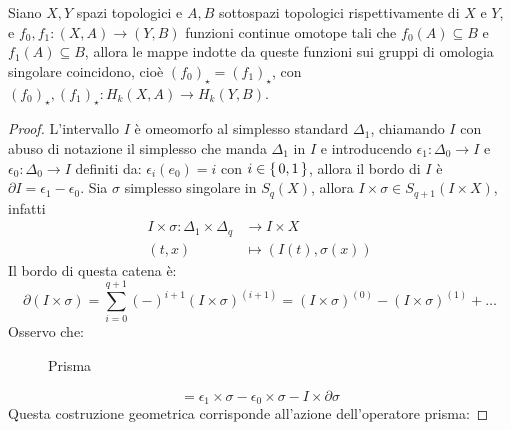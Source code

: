 \begin{theorem}
  Siano $ X, Y $ spazi topologici e $ A, B $ sottospazi topologici
  rispettivamente di $ X $ e $ Y $, e $ f_0, f_1 \colon (X, A) \to (Y, B) $ funzioni
  continue omotope tali che $ f_0(A) \subseteq B $ e $ f_1(A) \subseteq B $, allora le mappe
  indotte da queste funzioni sui gruppi di omologia singolare coincidono, cioè
  $ (f_0)_\star = (f_1)_\star $, con $ (f_0)_\star, (f_1)_\star \colon H_k(X,A) \to H_k(Y,B) $.
\end{theorem}
\begin{proof}
  L'intervallo $ I $ è omeomorfo al simplesso standard $ \Delta_1 $, chiamando
  $ I $ con abuso di notazione il simplesso che manda $ \Delta_1 $ in $ I $ e
  introducendo $ \epsilon_1 \colon \Delta_0 \to I $ e
  $ \epsilon_0 \colon \Delta_0 \to I $ definiti da: $ \epsilon_i(e_0) = i $ con
  $ i \in \set{0,1} $, allora il bordo di $ I $ è
  $ \partial I = \epsilon_1 - \epsilon_0 $. Sia $ \sigma $ simplesso singolare in
  $ S_q(X) $, allora $ I \times \sigma \in S_{q+1}(I \times X) $, infatti
  \begin{align*}
    I \times \sigma \colon \Delta_1 \times \Delta_q & \to I \times X \\
    (t,x) & \mapsto (I(t), \sigma(x))
  \end{align*}
  Il bordo di questa catena è:
  \[
    \partial (I \times \sigma) = \sum_{i=0}^{q+1} (-)^{i+1}(I \times \sigma)^{(i+1)} = (I \times \sigma)^{(0)} - (I \times \sigma)^{(1)} + \dots
  \]
  Osservo che:
  \begin{figure}[htbp]
    \centering
    \caption{Prisma}
    \label{fig:lez14:prism}
  \end{figure}
  \[
    = \epsilon_1 \times \sigma - \epsilon_0 \times \sigma - I \times \partial \sigma
  \]
  Questa costruzione geometrica corrisponde all'azione dell'operatore prisma:

\end{proof}
